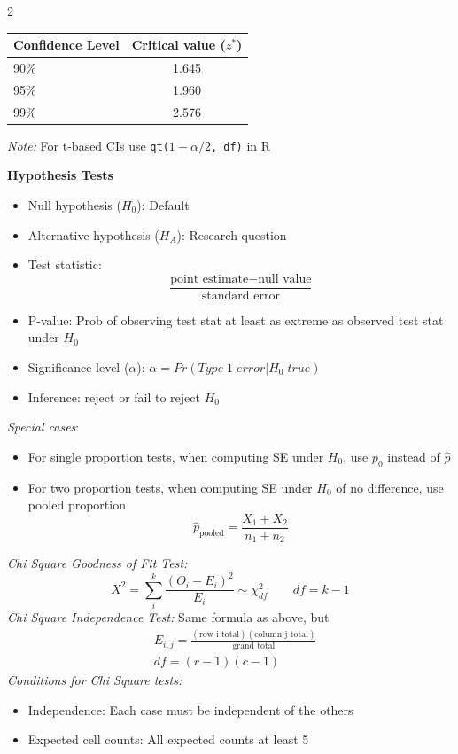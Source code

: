\documentclass[8pt]{article}
\begin{document}
\begin{multicols}{2}
\begin{center}
\begin{tabular}{|l|c|}
\hline
\textbf{Confidence Level} & \textbf{Critical value }($z^*$) \\
\hline
90\% & 1.645 \\
95\% & 1.960 \\
99\% & 2.576 \\
\hline
\end{tabular}%

\smallskip

\small\textit{Note:} For t-based CIs use \texttt{qt($1-\alpha/2$, df)} in R
\end{center}

\textbf{Hypothesis Tests}

\begin{itemize}
    \item Null hypothesis ($H_0$): Default
    \item Alternative hypothesis ($H_A$): Research question
    \item Test statistic: \[\frac{\text{point estimate} - \text{null value}}{\text{standard error}}\]
    \item P-value: Prob of observing test stat at least as extreme as observed test stat under $H_0$
    \item Significance level ($\alpha$): $\alpha=Pr(Type\; 1\; error | H_0\; true)$
    \item Inference: reject or fail to reject $H_0$
\end{itemize}

\textit{Special cases}:
\begin{itemize}
    \item For single proportion tests, when computing SE under $H_0$, use $p_0$ instead of $\hat{p}$
    \item For two proportion tests, when computing SE under $H_0$ of no difference, use pooled proportion \[\hat{p}_{\text{pooled}} = \frac{X_1 + X_2}{n_1 + n_2}\]
\end{itemize}

\textit{Chi Square Goodness of Fit Test:}
\[
    X^2 = \sum_i^k \frac{(O_i - E_i)^2}{E_i} \sim \chi^2_{df} \qquad
    df = k - 1 
\]
\textit{Chi Square Independence Test:}
Same formula as above, but
\begin{align*}
    & E_{i,j} = \frac{(\text{row i total})(\text{column j total})}{\text{grand total}} \\
    & df = (r - 1)(c - 1) 
\end{align*}
\textit{Conditions for Chi Square tests:}
\begin{itemize} 
    \item Independence: Each case must be independent of the others
    \item Expected cell counts: All expected counts at least 5
\end{itemize}  



\end{multicols}
\end{document}

